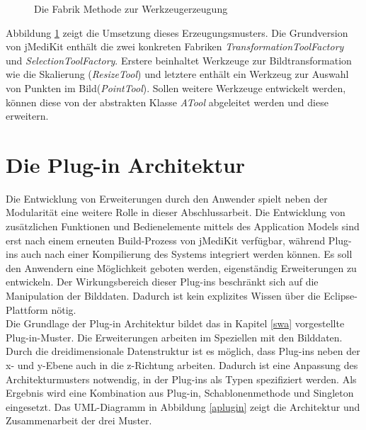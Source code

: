 \begin{figure}[htbp]
  \vspace{0.5cm}
  \centering
  \caption{Die Fabrik Methode zur Werkzeugerzeugung}
  \label{toolfactory}
  \vspace{0.5cm}
\end{figure}

Abbildung \ref{toolfactory} zeigt die Umsetzung dieses Erzeugungsmusters. Die Grundversion von jMediKit enthält die zwei konkreten Fabriken \textit{TransformationToolFactory} und \textit{SelectionToolFactory}. Erstere beinhaltet Werkzeuge zur Bildtransformation wie die Skalierung (\textit{ResizeTool}) und letztere enthält ein Werkzeug zur Auswahl von Punkten im Bild(\textit{PointTool}). Sollen weitere Werkzeuge entwickelt werden, können diese von der abstrakten Klasse \textit{ATool} abgeleitet werden und diese erweitern.

\FloatBarrier
\section{Die Plug-in Architektur}

Die Entwicklung von Erweiterungen durch den Anwender spielt neben der Modularität eine weitere Rolle in dieser Abschlussarbeit. Die Entwicklung von zusätzlichen Funktionen und Bedienelemente mittels des Application Models sind erst nach einem erneuten Build-Prozess von jMediKit verfügbar, während Plug-ins auch nach einer Kompilierung des Systems integriert werden können. Es soll den Anwendern eine Möglichkeit geboten werden, eigenständig Erweiterungen zu entwickeln. Der Wirkungsbereich dieser Plug-ins beschränkt sich auf die Manipulation der Bilddaten. Dadurch ist kein explizites Wissen über die Eclipse-Plattform nötig.\\
Die Grundlage der Plug-in Architektur bildet das in Kapitel \ref{swa} vorgestellte Plug-in-Muster. Die Erweiterungen arbeiten im Speziellen mit den Bilddaten. Durch die dreidimensionale Datenstruktur ist es möglich, dass Plug-ins neben der x- und y-Ebene auch in die z-Richtung arbeiten. Dadurch ist eine Anpassung des Architekturmusters notwendig, in der Plug-ins als Typen spezifiziert werden. Als Ergebnis wird eine Kombination aus Plug-in, Schablonenmethode und Singleton eingesetzt. Das UML-Diagramm in Abbildung \ref{aplugin} zeigt die Architektur und Zusammenarbeit der drei Muster.

